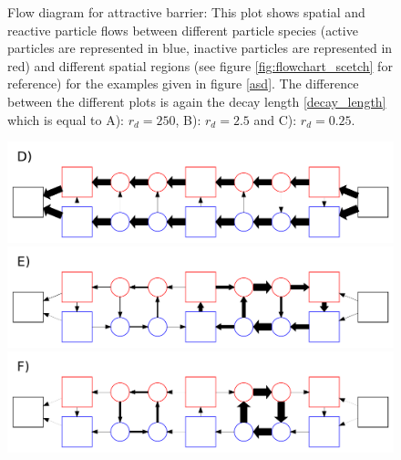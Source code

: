 \begin{minipage}[t]{.372 \textwidth}
    \vspace{.5 cm}
    \begin{figure}[H]
        \caption{Flow diagram for attractive barrier: This plot shows spatial and reactive particle flows between different particle species (active particles are represented in blue, inactive particles are represented in red) and different spatial regions (see figure \ref{fig:flowchart_scetch} for reference) for the examples given in figure \ref{asd}. The difference between the different plots is again the decay length \eqref{decay_length} which is equal to \newline A): $r_d=250$, B): $r_d=2.5$ and \newline C): $r_d = 0.25$.
    \label{fig:flow_attractive}}
    \end{figure}
\end{minipage}\hspace{0.02 \textwidth}\begin{minipage}[t]{.608 \textwidth}
    \vspace{0.6 cm}
    \begin{figure}[H]
        \includegraphics[width = 1 \textwidth]{plots/att_flowchart0.pdf}\vspace{0.2 cm}  \\
        \includegraphics[width = 1 \textwidth]{plots/att_flowchart1.pdf}\vspace{0.2 cm}  \\
        \includegraphics[width = 1 \textwidth]{plots/att_flowchart2.pdf}\vspace{0.2 cm}  \\
    \end{figure}
\end{minipage}
